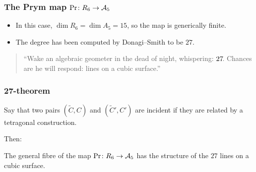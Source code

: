 \begin{frame}
\frametitle{The Prym map $\Pr \colon R_6 \to \mathcal{A}_5$}

\begin{itemize}
	\item In this case, $\dim R_6 = \dim A_5 = 15$, so the map is generically finite.
	\pause
	\item The degree has been computed by Donagi--Smith to be $27$.
\end{itemize}

\pause

\vfill
\begin{quote}
    \large
    ``Wake an algebraic geometer in the dead of night, \phantom{``}whispering: $27\mkern-3mu$. Chances are he will respond: lines on a \phantom{``}cubic surface.''
\end{quote}
\vfill 

\end{frame}

\begin{frame}
\frametitle{27-theorem}

\begin{definition}
Say that two pairs $(\widetilde C, C)$ and $(\widetilde C', C')$ are \alert{incident} if they are related by a tetragonal construction.
\end{definition}

\vspace*{1.5ex}
Then:
\vspace*{1ex}
\pause

\begin{theorem}
The general fibre of the map $\Pr \colon R_6 \to \mathcal{A}_5$ has the structure of the $27$ lines on a cubic surface.
\end{theorem}

\end{frame}